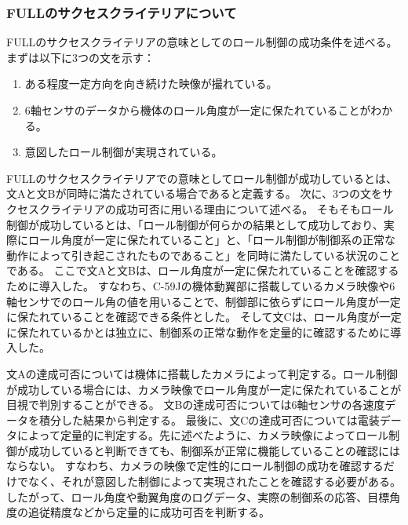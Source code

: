 \documentclass[a4paper,11pt,uplatex]{jsarticle}
\begin{document}
\subsubsection*{FULLのサクセスクライテリアについて}
FULLのサクセスクライテリアの意味としてのロール制御の成功条件を述べる。まずは以下に3つの文を示す：
\begin{enumerate}
	\item ある程度一定方向を向き続けた映像が撮れている。
	\item 6軸センサのデータから機体のロール角度が一定に保たれていることがわかる。
	\item 意図したロール制御が実現されている。
\end{enumerate}

FULLのサクセスクライテリアでの意味としてロール制御が成功しているとは、文Aと文Bが同時に満たされている場合であると定義する。
次に、3つの文をサクセスクライテリアの成功可否に用いる理由について述べる。
そもそもロール制御が成功しているとは、「ロール制御が何らかの結果として成功しており、実際にロール角度が一定に保たれていること」と、「ロール制御が制御系の正常な動作によって引き起こされたものであること」を同時に満たしている状況のことである。
ここで文Aと文Bは、ロール角度が一定に保たれていることを確認するために導入した。
すなわち、C-59Jの機体動翼部に搭載しているカメラ映像や6軸センサでのロール角の値を用いることで、制御部に依らずにロール角度が一定に保たれていることを確認できる条件とした。
そして文Cは、ロール角度が一定に保たれているかとは独立に、制御系の正常な動作を定量的に確認するために導入した。

文Aの達成可否については機体に搭載したカメラによって判定する。ロール制御が成功している場合には、カメラ映像でロール角度が一定に保たれていることが目視で判別することができる。
文Bの達成可否については6軸センサの各速度データを積分した結果から判定する。
最後に、文Cの達成可否については電装データによって定量的に判定する。先に述べたように、カメラ映像によってロール制御が成功していると判断できても、制御系が正常に機能していることの確認にはならない。
すなわち、カメラの映像で定性的にロール制御の成功を確認するだけでなく、それが意図した制御によって実現されたことを確認する必要がある。
したがって、ロール角度や動翼角度のログデータ、実際の制御系の応答、目標角度の追従精度などから定量的に成功可否を判断する。

\newpage
\end{document}
